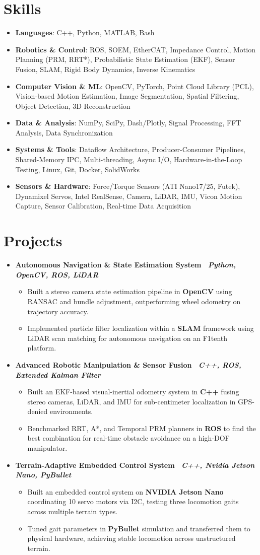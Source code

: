 \documentclass[letterpaper,10pt]{article}
\newcommand{\resumeItem}[1]{
  \begin{itemize}[leftmargin=*,label={\textbullet}, itemsep=-8pt]
    \item {#1}
    \vspace{-8pt}
  \end{itemize}
}
\newcommand{\resumeSubheadingproject}[1]{
  \item
    \textbf{#1} \hfill  \\
    \vspace{-5pt}
}
\newcommand{\resumeSectionStart}{\begin{itemize}[leftmargin=0.15in, label={}]}
\newcommand{\resumeSectionEnd}{\end{itemize}\vspace{-5pt}}
\begin{document}
\section{Skills}
\resumeSectionStart
    \resumeItem{\textbf{Languages}{: C++, Python, MATLAB, Bash}}
    \resumeItem{\textbf{Robotics \& Control}{: ROS, SOEM, EtherCAT, Impedance Control, Motion Planning (PRM, RRT*), Probabilistic State Estimation (EKF), Sensor Fusion, SLAM, Rigid Body Dynamics, Inverse Kinematics}}
    \resumeItem{\textbf{Computer Vision \& ML}{: OpenCV, PyTorch, Point Cloud Library (PCL), Vision-based Motion Estimation, Image Segmentation, Spatial Filtering, Object Detection, 3D Reconstruction}}
    \resumeItem{\textbf{Data \& Analysis}{: NumPy, SciPy, Dash/Plotly, Signal Processing, FFT Analysis, Data Synchronization}}
    \resumeItem{\textbf{Systems \& Tools}{: Dataflow Architecture, Producer-Consumer Pipelines, Shared-Memory IPC, Multi-threading, Async I/O, Hardware-in-the-Loop Testing, Linux, Git, Docker, SolidWorks}}
    \resumeItem{\textbf{Sensors \& Hardware}{: Force/Torque Sensors (ATI Nano17/25, Futek), Dynamixel Servos, Intel RealSense, Camera, LiDAR, IMU, Vicon Motion Capture, Sensor Calibration, Real-time Data Acquisition}}
\resumeSectionEnd

\section{Projects}
\resumeSectionStart
    \resumeSubheadingproject{Autonomous Navigation \& State Estimation System \textbar\ \normalfont \textit{Python, OpenCV, ROS, LiDAR}}
    \resumeItem{Built a stereo camera state estimation pipeline in \textbf{OpenCV} using RANSAC and bundle adjustment, outperforming wheel odometry on trajectory accuracy.}
    \resumeItem{Implemented particle filter localization within a \textbf{SLAM} framework using LiDAR scan matching for autonomous navigation on an F1tenth platform.}

    \resumeSubheadingproject{Advanced Robotic Manipulation \& Sensor Fusion \textbar\ \normalfont \textit{C++, ROS, Extended Kalman Filter}}
    \resumeItem{Built an EKF-based visual-inertial odometry system in \textbf{C++} fusing stereo cameras, LiDAR, and IMU for sub-centimeter localization in GPS-denied environments.}
    \resumeItem{Benchmarked RRT, A*, and Temporal PRM planners in \textbf{ROS} to find the best combination for real-time obstacle avoidance on a high-DOF manipulator.}

    \resumeSubheadingproject{Terrain-Adaptive Embedded Control System \textbar\ \normalfont \textit{C++, Nvidia Jetson Nano, PyBullet}}
    \resumeItem{Built an embedded control system on \textbf{NVIDIA Jetson Nano} coordinating 10 servo motors via I2C, testing three locomotion gaits across multiple terrain types.}
    \resumeItem{Tuned gait parameters in \textbf{PyBullet} simulation and transferred them to physical hardware, achieving stable locomotion across unstructured terrain.}
\resumeSectionEnd
\end{document}
